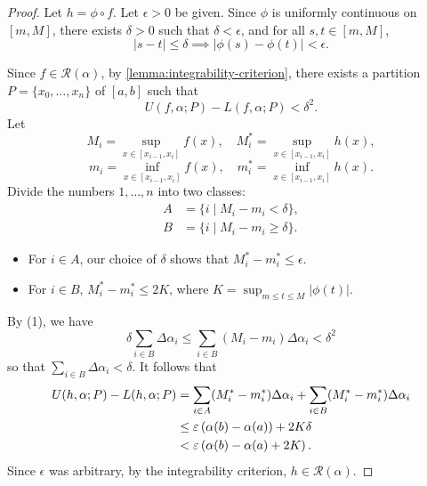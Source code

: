 \begin{proof}
Let $h=\phi\circ f$. Let $\epsilon>0$ be given. Since $\phi$ is uniformly continuous on $[m,M]$, there exists $\delta>0$ such that $\delta<\epsilon$, and for all $s,t\in[m,M]$,
\[|s-t|\le\delta\implies|\phi(s)-\phi(t)|<\epsilon.\]

Since $f\in \mathcal{R}(\alpha)$, by \ref{lemma:integrability-criterion}, there exists a partition $P=\{x_0,\dots,x_n\}$ of $[a,b]$ such that
\begin{equation*}\tag{1}
U(f,\alpha;P)-L(f,\alpha;P)<\delta^2.
\end{equation*}
Let 
\[M_i=\sup_{x\in[x_{i-1},x_i]}f(x),\quad M_i^*=\sup_{x\in[x_{i-1},x_i]}h(x),\]
\[m_i=\inf_{x\in[x_{i-1},x_i]}f(x),\quad m_i^*=\inf_{x\in[x_{i-1},x_i]}h(x).\]
Divide the numbers $1,\dots,n$ into two classes:
\begin{align*}
A&=\{i\mid M_i-m_i<\delta\},\\
B&=\{i\mid M_i-m_i\ge\delta\}.
\end{align*}
\begin{itemize}
\item For $i\in A$, our choice of $\delta$ shows that $M_i^*-m_i^*\le\epsilon$.
\item For $i\in B$, $M_i^*-m_i^*\le 2K$, where $\displaystyle K=\sup_{m\le t\le M}|\phi(t)|$.
\end{itemize}
By (1), we have
\[\delta\sum_{i\in B}\Delta\alpha_i\le\sum_{i\in B}(M_i-m_i)\Delta\alpha_i<\delta^2\]
so that $\sum_{i\in B}\Delta\alpha_i<\delta$. It follows that
\begin{align*}
U(h,\alpha;P)-L(h,\alpha;P)
&=\sum_{i\in A}(M_i^*-m_i^*)\Delta\alpha_i+\sum_{i\in B}(M_i^*-m_i^*)\Delta\alpha_i\\
&\le\varepsilon\left(\alpha(b)-\alpha(a)\right)+2K\delta\\
&<\varepsilon\left(\alpha(b)-\alpha(a)+2K\right).
\end{align*}
Since $\epsilon$ was arbitrary, by the integrability criterion, $h\in\mathcal{R}(\alpha)$.
\end{proof}
\pagebreak

